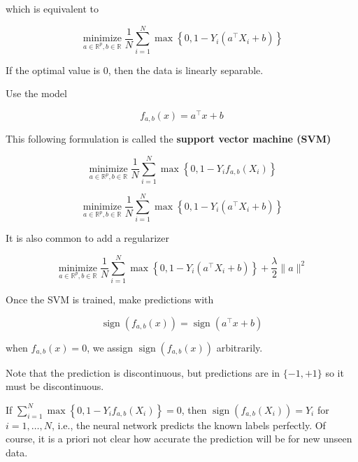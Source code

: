 \documentclass{report}
\begin{document}
which is equivalent to

$$
\underset{a \in \mathbb{R}^{p}, b \in \mathbb{R}}{\operatorname{minimize}} \frac{1}{N} \sum_{i=1}^{N} \max \left\{0,1-Y_{i}\left(a^{\top} X_{i}+b\right)\right\}
$$

If the optimal value is 0, then the data is linearly separable.

\begin{definition}
    Use the model

    $$
    f_{a, b}(x)=a^{\top} x+b
    $$

    This following formulation is called the \textbf{support vector machine (SVM)}

    $$
    \underset{a \in \mathbb{R}^{p}, b \in \mathbb{R}}{\operatorname{minimize}} \frac{1}{N} \sum_{i=1}^{N} \max \left\{0,1-Y_{i} f_{a, b}\left(X_{i}\right)\right\}
    $$

    $$
    \underset{a \in \mathbb{R}^{p}, b \in \mathbb{R}}{\operatorname{minimize}} \frac{1}{N} \sum_{i=1}^{N} \max \left\{0,1-Y_{i}\left(a^{\top} X_{i}+b\right)\right\}
    $$

    It is also common to add a regularizer

    $$
    \underset{a \in \mathbb{R}^{p}, b \in \mathbb{R}}{\operatorname{minimize}} \frac{1}{N} \sum_{i=1}^{N} \max \left\{0,1-Y_{i}\left(a^{\top} X_{i}+b\right)\right\}+\frac{\lambda}{2}\|a\|^{2}
    $$
\end{definition}

\begin{concept}
    Once the SVM is trained, make predictions with

    $$
    \operatorname{sign}\left(f_{a, b}(x)\right)=\operatorname{sign}\left(a^{\top} x+b\right)
    $$

    when $f_{a, b}(x)=0$, we assign $\operatorname{sign}\left(f_{a, b}(x)\right)$ arbitrarily.

    Note that the prediction is discontinuous, but predictions are in $\{-1,+1\}$ so it must be discontinuous.

    If $\sum_{i=1}^{N} \max \left\{0,1-Y_{i} f_{a, b}\left(X_{i}\right)\right\}=0$, then $\operatorname{sign}\left(f_{a, b}\left(X_{i}\right)\right)=Y_{i}$ for $i=1, \ldots, N$, i.e., the neural network predicts the known labels perfectly.
    Of course, it is a priori not clear how accurate the prediction will be for new unseen data.
\end{concept}
\end{document}
